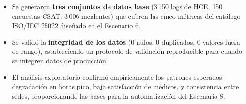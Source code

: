 \documentclass[12pt,a4paper]{article}
\begin{document}
\begin{tcolorbox}[colback=green!5, colframe=green!50!black, title=Resultado obtenido]
\begin{itemize}
    \item Se generaron \textbf{tres conjuntos de datos base} (3\,150 logs de HCE, 150 encuestas CSAT, 3\,006 incidentes) que cubren las cinco m\'etricas del cat\'alogo ISO/IEC 25022 dise\~nado en el Escenario 6.
    \item Se valid\'o la \textbf{integridad de los datos} (0 nulos, 0 duplicados, 0 valores fuera de rango), estableciendo un protocolo de validaci\'on reproducible para cuando se integren datos de producci\'on.
    \item El an\'alisis exploratorio confirm\'o emp\'iricamente los patrones esperados: degradaci\'on en horas pico, baja satisfacci\'on de m\'edicos, y consistencia entre sedes, proporcionando las bases para la automatizaci\'on del Escenario 8.
\end{itemize}
\end{tcolorbox}
\end{document}
